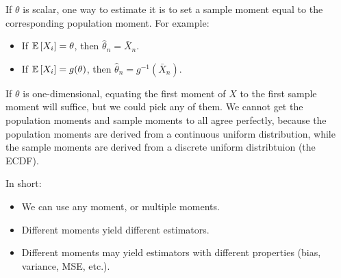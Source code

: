 \begin{remark}	If $\theta$ is scalar, one way to estimate it is to set a sample moment equal to the corresponding population moment. For example:
	\begin{itemize}
		\item If $\mathbb{E}\left[X_i\right]=\theta$, then $\hat\theta_n=\bar X_n$.
		\item If $\mathbb{E}\left[X_i\right]=g(\theta)$, then $\hat\theta_n=g^{-1}(\bar X_n)$.
	\end{itemize}

	If $\theta$ is one-dimensional, equating the first moment of $X$ to the first sample moment will suffice, but we could pick any of them. We cannot get the population moments and sample moments to all agree perfectly, because the population moments are derived from a continuous uniform distribution, while the sample moments are derived from a discrete uniform distribtuion (the ECDF).

	In short:
	\begin{itemize}
		\item We can use any moment, or multiple moments.
		\item Different moments yield different estimators.
		\item Different moments may yield estimators with different properties (bias, variance, MSE, etc.).
	\end{itemize}
\end{remark}

